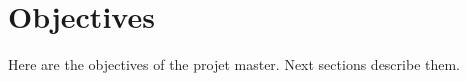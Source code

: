 \section{Objectives}
\label{objectives}

Here are the objectives of the projet master. Next sections describe them.
